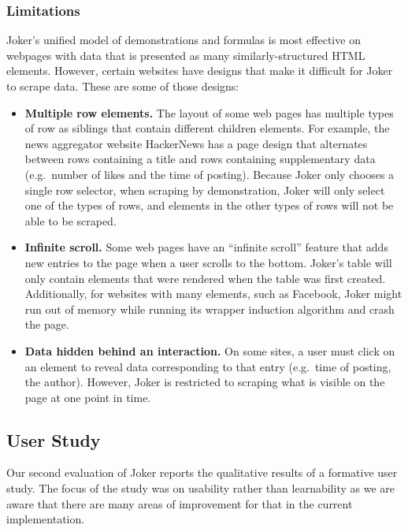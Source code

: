 \documentclass[sigconf,10pt]{acmart}
\providecommand{\tightlist}{%
  \setlength{\itemsep}{0pt}\setlength{\parskip}{0pt}}
\begin{document}
\hypertarget{limitations}{%
\subsubsection{Limitations}\label{limitations}}

Joker's unified model of demonstrations and formulas is most effective
on webpages with data that is presented as many similarly-structured
HTML elements. However, certain websites have designs that make it
difficult for Joker to scrape data. These are some of those designs:

\begin{itemize}
\tightlist
\item
  \textbf{Multiple row elements.} The layout of some web pages has
  multiple types of row as siblings that contain different children
  elements. For example, the news aggregator website HackerNews has a
  page design that alternates between rows containing a title and rows
  containing supplementary data (e.g.~number of likes and the time of
  posting). Because Joker only chooses a single row selector, when
  scraping by demonstration, Joker will only select one of the types of
  rows, and elements in the other types of rows will not be able to be
  scraped.
\item
  \textbf{Infinite scroll.} Some web pages have an ``infinite scroll''
  feature that adds new entries to the page when a user scrolls to the
  bottom. Joker's table will only contain elements that were rendered
  when the table was first created. Additionally, for websites with many
  elements, such as Facebook, Joker might run out of memory while
  running its wrapper induction algorithm and crash the page.
\item
  \textbf{Data hidden behind an interaction.} On some sites, a user must
  click on an element to reveal data corresponding to that entry
  (e.g.~time of posting, the author). However, Joker is restricted to
  scraping what is visible on the page at one point in time.
\end{itemize}

\hypertarget{user-study}{%
\subsection{User Study}\label{user-study}}

Our second evaluation of Joker reports the qualitative results of a
formative user study. The focus of the study was on usability rather
than learnability as we are aware that there are many areas of
improvement for that in the current implementation.
\end{document}
